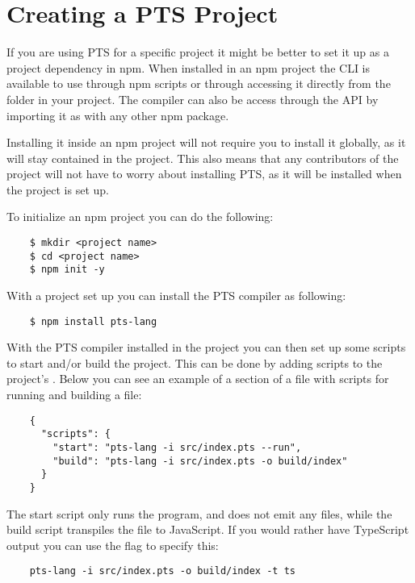 \section{Creating a PTS Project}\label{sec:creating-a-pts-project}

If you are using PTS for a specific project it might be better to set it up as a project dependency in npm.
When installed in an npm project the CLI is available to use through npm scripts or through accessing it directly from the  folder in your project.
The compiler can also be access through the API by importing it as with any other npm package.

Installing it inside an npm project will not require you to install it globally, as it will stay contained in the project.
This also means that any contributors of the project will not have to worry about installing PTS, as it will be installed when the project is set up.

To initialize an npm project you can do the following:

\begin{verbatim}
    $ mkdir <project name>
    $ cd <project name>
    $ npm init -y
\end{verbatim}

With a project set up you can install the PTS compiler as following:

\begin{verbatim}
    $ npm install pts-lang
\end{verbatim}

With the PTS compiler installed in the project you can then set up some scripts to start and/or build the project.
This can be done by adding scripts to the project's .
Below you can see an example of a section of a  file with scripts for running and building a file:

\begin{verbatim}
    {
      "scripts": {
        "start": "pts-lang -i src/index.pts --run",
        "build": "pts-lang -i src/index.pts -o build/index"
      }
    }
\end{verbatim}

The start script only runs the program, and does not emit any files, while the build script transpiles the  file to JavaScript.
If you would rather have TypeScript output you can use the  flag to specify this:

\begin{verbatim}
    pts-lang -i src/index.pts -o build/index -t ts
\end{verbatim}

